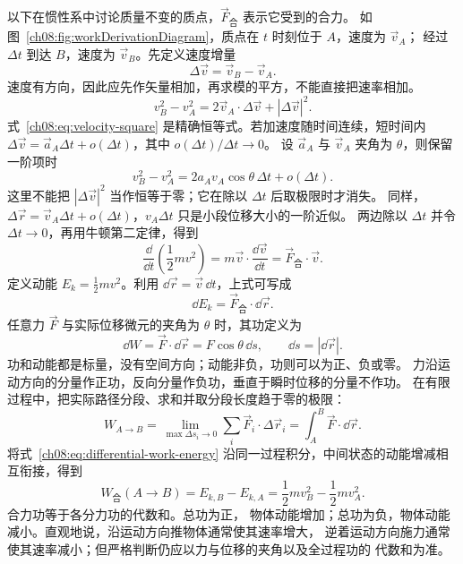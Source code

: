 {以下在惯性系中讨论质量不变的质点，$\vec F_{\text{合}}$ 表示它受到的合力。
如图~\ref{ch08:fig:workDerivationDiagram}，质点在 $t$ 时刻位于 $A$，速度为 $\vec v_A$；
经过 $\Delta t$ 到达 $B$，速度为 $\vec v_B$。先定义速度增量
\[
\Delta\vec v=\vec v_B-\vec v_A.
\]
速度有方向，因此应先作矢量相加，再求模的平方，不能直接把速率相加。
\workDerivationDiagram
\begin{equation}
 v_B^2-v_A^2=2\vec v_A\cdot\Delta\vec v+|\Delta\vec v|^2.
 \label{ch08:eq:velocity-square}
\end{equation}
式~\eqref{ch08:eq:velocity-square} 是精确恒等式。若加速度随时间连续，短时间内
$\Delta\vec v=\vec a_A\Delta t+o(\Delta t)$，其中 $o(\Delta t)/\Delta t\to0$。
设 $\vec a_A$ 与 $\vec v_A$ 夹角为 $\theta$，则保留一阶项时
\begin{equation}
 v_B^2-v_A^2=2a_Av_A\cos\theta\,\Delta t+o(\Delta t).
\end{equation}
这里不能把 $|\Delta\vec v|^2$ 当作恒等于零；它在除以 $\Delta t$ 后取极限时才消失。
同样，$\Delta\vec r=\vec v_A\Delta t+o(\Delta t)$，$v_A\Delta t$ 只是小段位移大小的一阶近似。
两边除以 $\Delta t$ 并令 $\Delta t\to0$，再用牛顿第二定律，得到
\begin{equation}
 \frac{\dd}{\dd t}\left(\frac12mv^2\right)
 =m\vec v\cdot\frac{\dd\vec v}{\dd t}
 =\vec F_{\text{合}}\cdot\vec v.
 \label{ch08:eq:kinetic-rate}
\end{equation}
定义动能 $E_k=\tfrac12mv^2$。利用 $\dd\vec r=\vec v\,\dd t$，上式可写成
\begin{equation}
 \dd E_k=\vec F_{\text{合}}\cdot\dd\vec r.
 \label{ch08:eq:differential-work-energy}
\end{equation}
任意力 $\vec F$ 与实际位移微元的夹角为 $\theta$ 时，其功定义为
\begin{equation}
 \dd W=\vec F\cdot\dd\vec r=F\cos\theta\,\dd s,
 \qquad \dd s=|\dd\vec r|.
 \label{ch08:eq:work-element}
\end{equation}
功和动能都是标量，没有空间方向；动能非负，功则可以为正、负或零。
力沿运动方向的分量作正功，反向分量作负功，垂直于瞬时位移的分量不作功。
在有限过程中，把实际路径分段、求和并取分段长度趋于零的极限：
\begin{equation}
 W_{A\to B}=\lim_{\max\Delta s_i\to0}\sum_i\vec F_i\cdot\Delta\vec r_i
 =\int_A^B\vec F\cdot\dd\vec r.
 \label{ch08:eq:work-integral}
\end{equation}
将式~\eqref{ch08:eq:differential-work-energy} 沿同一过程积分，中间状态的动能增减相互衔接，得到
\begin{equation}
 W_{\text{合}}(A\to B)=E_{k,B}-E_{k,A}
 =\frac12mv_B^2-\frac12mv_A^2.
 \label{ch08:eq:work-energy}
\end{equation}
合力功等于各分力功的代数和。总功为正，
物体动能增加；总功为负，物体动能减小。直观地说，沿运动方向推物体通常使其速率增大，
逆着运动方向施力通常使其速率减小；但严格判断仍应以力与位移的夹角以及全过程功的
代数和为准。

}
